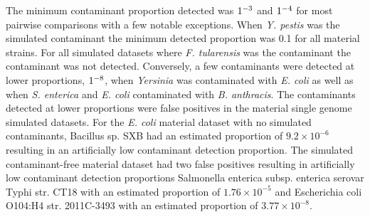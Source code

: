 \documentclass[fleqn,10pt,lineno]{wlpeerj}\usepackage[]{graphicx}\usepackage[]{color}
\begin{document}


The minimum contaminant proportion detected was $1 \time 10^{-3}$ and  $1 \time 10^{-4}$ for most pairwise comparisons with a few notable exceptions. 
When \textit{Y. pestis} was the simulated contaminant the minimum detected proportion was 0.1 for all material strains. 
For all simulated datasets where \textit{F. tularensis} was the contaminant the contaminant was not detected.
Conversely, a few contaminants were detected at lower proportions, $1 \time 10^{-8}$, when \textit{Yersinia} was contaminated with \textit{E. coli} as well as when \textit{S. enterica} and \textit{E. coli} contaminated with \textit{B. anthracis}. 
The contaminants detected at lower proportions were false positives in the material single genome simulated datasets. 
For the \textit{E. coli} material dataset with no simulated contaminants, Bacillus sp. SXB had an estimated proportion of \ensuremath{9.2\times 10^{-6}} resulting in an artificially low contaminant detection proportion. 
The simulated contaminant-free  material dataset had two false positives resulting in artificially low contaminant detection proportions Salmonella enterica subsp. enterica serovar Typhi str. CT18 with an estimated proportion of \ensuremath{1.76\times 10^{-5}} and Escherichia coli O104:H4 str. 2011C-3493 with an estimated proportion of \ensuremath{3.77\times 10^{-8}}.
\end{document}
